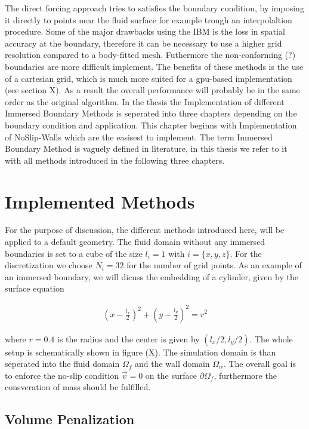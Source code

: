 The direct forcing approach tries to satisfies the boundary condition, by imposing it directly to points near the fluid surface for example
trough an interpolaltion procedure.
Some of the major drawbacks using the IBM is the loss in  spatial accuracy at the boundary, therefore it can be necessary to use a higher grid resolution
compared to a body-fitted mesh.  Futhermore the non-conforming (?) boundaries are more difficult implement.
The benefits of these methods is the use of a cartesian grid, which is much more suited for a gpu-based implementation (see section X).
As a result the overall performance will probably be in the same order as the original algorithm.
In the thesis the Implementation of different Immersed Boundary Methods is seperated into three chapters depending on the boundary condition and application.
This chapter beginns with Implementation of NoSlip-Walls which are the easisest to implement.
The term Immersed Boundary Method is vaguely defined in literature, in this thesis we refer to it with all methods introduced in the following three chapters.

\newpage

\section{Implemented Methods}

For the purpose of discussion, the different methods introduced here, will be applied to a default geometry.
The fluid domain without any immersed boundaries is set to a cube of the size $l_i= 1$ with  $i = \{x, y, z\}$.
For the discretization we choose $N_i = 32$ for the number of grid points.
As an example of an immersed boundary, we will dicuss the embedding of a cylinder, given by the  surface equation

\begin{align}
    \left(x - \frac{l_x}{2}\right)^2 + \left(y - \frac{l_y}{2}\right)^2 = r^2
\end{align}

where $r=0.4$ is the radius and the center is given by $(l_x/2, l_y/2)$. The whole setup is schematically shown in figure (X).
The simulation domain is than seperated into the fluid domain $\Omega_f$ and the wall domain $\Omega_w$.
The overall goal is to enforce the no-slip condition $\vec{v} = 0$ on the surface $\partial \Omega_f$, furthermore
the consveration of mass should be fulfilled.

\subsection{Volume Penalization}

